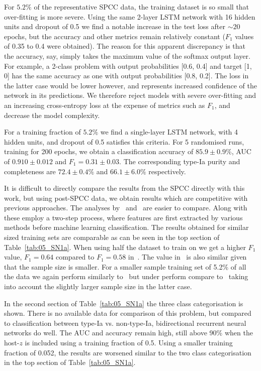 \documentclass[twocolumn]{aastex61}
\begin{document}
For $5.2\%$ of the representative SPCC data, the training dataset is so small that over-fitting is more severe. Using the same 2-layer LSTM network with 16 hidden units and dropout of 0.5 we find a notable increase in the test loss after $\sim 20$ epochs, but the accuracy and other metrics remain relatively constant ($F_1$ values of 0.35 to 0.4 were obtained). The reason for this apparent discrepancy is that the accuracy, say, simply takes the maximum value of the softmax output layer. For example, a 2-class problem with output probabilities [0.6, 0.4] and target [1, 0] has the same accuracy as one with output probabilities [0.8, 0.2]. The loss in the latter case would be lower however, and represents increased confidence of the network in its predictions. We therefore reject models with severe over-fitting and an increasing cross-entropy loss at the expense of metrics such as $F_1$, and decrease the model complexity. 

For a training fraction of  $5.2\%$ we find a single-layer LSTM network, with 4 hidden units, and dropout of 0.5 satisfies this criteria. For 5 randomised runs, training for 200 epochs, we obtain a classification accuracy of $85.9 \pm 0.9$\%, AUC of $0.910 \pm 0.012$ and $F_1 = 0.31 \pm 0.03$. The corresponding type-Ia purity and completeness are $72.4\pm0.4\%$ and $66.1\pm6.0\%$ respectively.

It is difficult to directly compare the results from the SPCC directly with this work, but using post-SPCC data, we obtain results which are competitive with previous approaches. The analyses by~\cite{Karpenka:2012pm} and~\cite{Newling:2010bp} are easier to compare. Along with~\cite{Lochner:2016hbn} these employ a two-step process, where features are first extracted by various methods before machine learning classification. The results obtained for similar sized training sets are comparable as can be seen in the top section of Table~\ref{tab:05_SN1a}. When using half the dataset to train on we get a higher $F_1$ value, $F_1=0.64$ compared to $F_1=0.58$ in~\cite{Karpenka:2012pm}. The value in~\cite{Newling:2010bp} is also similar given that the sample size is smaller. For a smaller sample training set of 5.2\% of all the data we again perform similarly to~\cite{Karpenka:2012pm} but under perform compare to~\cite{Newling:2010bp} taking into account the slightly larger sample size in the latter case.

In the second section of Table~\ref{tab:05_SN1a} the three class categorisation is shown. There is no available data for comparison of this problem, but compared to classification between type-Ia vs. non-type-Ia, bidirectional recurrent neural networks do well. The AUC and accuracy remain high, still above 90\% when the host-$z$ is included using a training fraction of 0.5. Using a smaller training fraction of 0.052, the results are worsened similar to the two class categorisation in the top section of Table~\ref{tab:05_SN1a}.
\end{document}
